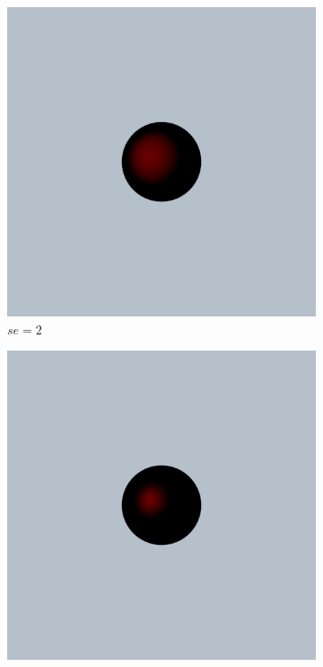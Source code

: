 \documentclass{article}
\begin{document}
\begin{figure}[h!]
	\centering
	\begin{subfigure}{0.2\textwidth}
		\includegraphics[width=\textwidth]{specular_sc_0_1_se_2}
		\caption{$se = 2$}
		\label{fig:specular_0_1_2}
	\end{subfigure}%
	\hfill
	\begin{subfigure}{0.2\textwidth}
		\includegraphics[width=\textwidth]{specular_sc_0_1_se_8}

\end{subfigure}
\end{figure}
\end{document}
